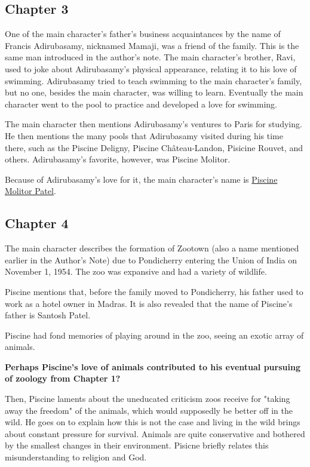 \documentclass[11pt]{article}
\begin{document}
\subsection{Chapter 3}
\label{sec:orgf984795}
One of the main character's father's business acquaintances by the name of Francis Adirubasamy, nicknamed Mamaji, was a friend of the family. This is the same man introduced in the author's note. The main character's brother, Ravi, used to joke about Adirubasamy's physical appearance, relating it to his love of swimming. Adirubasamy tried to teach swimming to the main character's family, but no one, besides the main character, was willing to learn. Eventually the main character went to the pool to practice and developed a love for swimming.

The main character then mentions Adirubasamy's ventures to Paris for studying. He then mentions the many pools that Adirubasamy visited during his time there, such as the Piscine Deligny, Piscine Château-Landon, Pisicine Rouvet, and others. Adirubasamy's favorite, however, was Piscine Molitor.

Because of Adirubasamy's love for it, the main character's name is \uline{Piscine Molitor Patel}.
\subsection{Chapter 4}
\label{sec:orgafae2b7}
The main character describes the formation of Zootown (also a name mentioned earlier in the Author's Note) due to Pondicherry entering the Union of India on November 1, 1954. The zoo was expansive and had a variety of wildlife.

Piscine mentions that, before the family moved to Pondicherry, his father used to work as a hotel owner in Madras. It is also revealed that the name of Piscine's father is Santosh Patel.

Piscine had fond memories of playing around in the zoo, seeing an exotic array of animals.

\textbf{Perhaps Piscine's love of animals contributed to his eventual pursuing of zoology from Chapter 1?}

Then, Piscine laments about the uneducated criticism zoos receive for "taking away the freedom" of the animals, which would supposedly be better off in the wild. He goes on to explain how this is not the case and living in the wild brings about constant pressure for survival. Animals are quite conservative and bothered by the smallest changes in their environment. Pisicne briefly relates this misunderstanding to religion and God.
\end{document}
